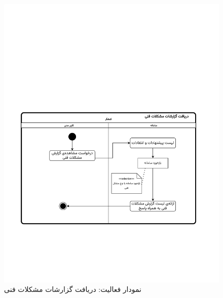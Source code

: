 \begin{figure}[ht!]
	\centering
	\includegraphics[scale=0.8, page=1]{figs/OOD-activity-techrep.pdf}
	\caption{نمودار فعالیت: دریافت گزارشات مشکلات فنی}
\end{figure}
\FloatBarrier
\newpage

